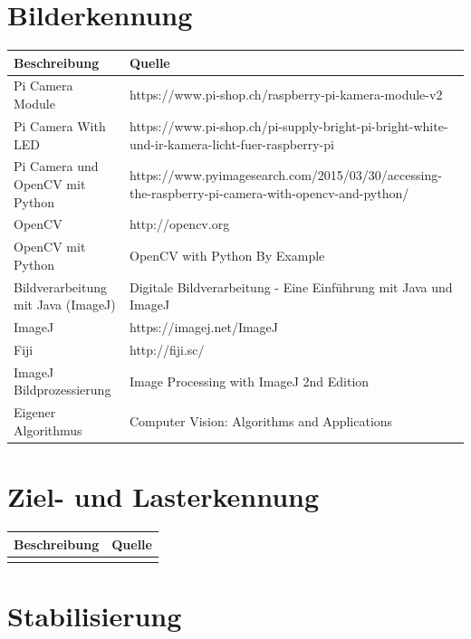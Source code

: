 \documentclass[a4paper]{report}
\begin{document}
\section{Bilderkennung}

\vspace{1em}
\noindent
\begin{tabular}{|p{}|p{}|}
	\hline 
	\textbf{Beschreibung} & \textbf{Quelle} \\
	\hline
	Pi Camera Module & https://www.pi-shop.ch/raspberry-pi-kamera-module-v2\\
	\hline
	Pi Camera With LED & https://www.pi-shop.ch/pi-supply-bright-pi-bright-white-und-ir-kamera-licht-fuer-raspberry-pi\\
	\hline
	Pi Camera und OpenCV mit Python & https://www.pyimagesearch.com/2015/03/30/accessing-the-raspberry-pi-camera-with-opencv-and-python/\\
	\hline
	OpenCV & http://opencv.org \\
	\hline
	OpenCV mit Python & OpenCV with Python By Example \\
	\hline
	Bildverarbeitung mit Java (ImageJ) & Digitale Bildverarbeitung - Eine Einführung mit Java und ImageJ\\
	\hline
	ImageJ & https://imagej.net/ImageJ \\
	\hline
	Fiji & http://fiji.sc/ \\
	\hline
	ImageJ Bildprozessierung & Image Processing with ImageJ 2nd Edition \\
	\hline
	Eigener Algorithmus & Computer Vision: Algorithms and Applications\\
	\hline
\end{tabular}

\section{Ziel- und Lasterkennung}

\vspace{1em}
\noindent
\begin{tabular}{|l|l|}
	\hline 
	\textbf{Beschreibung} & \textbf{Quelle} \\
	\hline
	&  \\
	\hline
\end{tabular}

\section{Stabilisierung}
\end{document}
